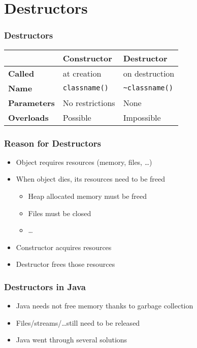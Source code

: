 \section{Destructors}
\frame{\tableofcontents[currentsection]}

\begin{frame}
  \frametitle{Destructors}
  \begin{center}
    \begin{tabular}{lll}
      & \textbf{Constructor} & \textbf{Destructor} \\
      \toprule
      \textbf{Called} & at creation & on destruction \\
      \textbf{Name} & {\tt classname()} & {\tt \~{}classname()} \\
      \textbf{Parameters} & No restrictions & None \\
      \textbf{Overloads} & Possible & Impossible \\
    \end{tabular}
  \end{center}
  \vskip5mm
\end{frame}

\begin{frame}
  \frametitle{Reason for Destructors}
  \begin{itemize}
    \item Object requires resources (memory, files, \dots)
    \item When object dies, its resources need to be freed
          \begin{itemize}
            \item Heap allocated memory must be freed
            \item Files must be closed
            \item \dots
          \end{itemize}
    \item Constructor acquires resources
    \item Destructor frees those resources
  \end{itemize}
\end{frame}

\begin{frame}
  \frametitle{Destructors in Java}
  \begin{itemize}
    \item Java needs not free memory thanks to garbage collection
    \item Files/streams/\dots still need to be released
    \item Java went through several solutions
  \end{itemize}
\end{frame}

